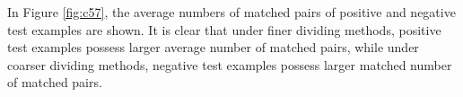 In Figure \ref{fig:c57}, the average numbers of matched pairs of positive and negative test examples are shown. It is clear that under finer dividing methods, positive test examples possess larger average number of matched pairs, while under coarser dividing methods, negative test examples possess larger matched number of matched pairs.

